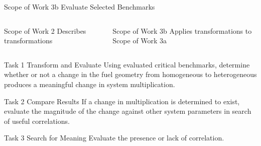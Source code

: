 \documentclass[10pt,aspectratio=169]{beamer}              %
\begin{document}
\begin{frame}{Scope of Work 3b \textendash Evaluate Selected Benchmarks}
    \begin{columns}
        \begin{alertblock}{Scope of Work 2}
            Describes transformations 
        \end{alertblock}
        \begin{alertblock}{Scope of Work 3b}
            Applies transformations to Scope of Work 3a
        \end{alertblock}
    \end{columns}
    \begin{block}{Task 1 \textendash Transform and Evaluate}
        Using evaluated critical benchmarks, determine whether or not a change in the fuel geometry from homogeneous to heterogeneous produces a meaningful change in system multiplication.
    \end{block}
    \begin{block}{Task 2 \textendash Compare Results}
        If a change in multiplication is determined to exist, evaluate the magnitude of the change against other system parameters in search of useful correlations.
    \end{block}
    \begin{block}{Task 3 \textendash Search for Meaning}
        Evaluate the presence or lack of correlation.
    \end{block}
\end{frame}
\end{document}
